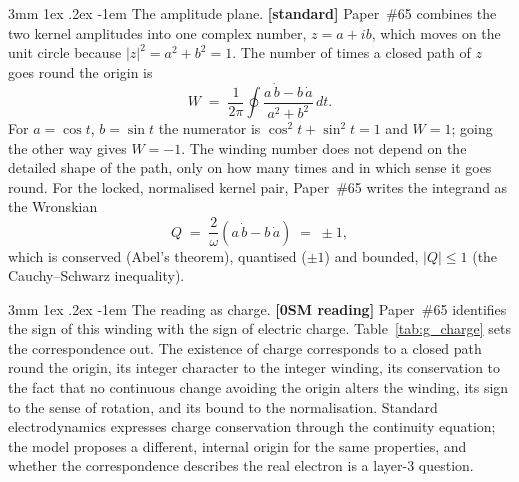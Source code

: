 \documentclass[%
 reprint, amsmath,amssymb, aps, prb, ]{revtex4-2}
\makeatletter
\numberwithin{equation}{section}
\renewcommand\paragraph{%
  \@startsection{paragraph}{4}{\z@}%
    {3mm \@plus 1ex \@minus .2ex}%
    {-1em}%
    {\normalfont\normalsize\itshape}}
\makeatother
\begin{document}
\paragraph{The amplitude plane.} \textbf{[standard]} Paper~\#65 combines the two kernel amplitudes into one complex number, $z = a + ib$, which moves on the unit circle because $\lvert z\rvert^{2} = a^{2} + b^{2} = 1$. The number of times a closed path of $z$ goes round the origin is
\begin{equation}
W \;=\; \frac{1}{2\pi}\oint \frac{a\,\dot b - b\,\dot a}{a^{2} + b^{2}}\,dt .
\label{eq:g_W}
\end{equation}
For $a = \cos t$, $b = \sin t$ the numerator is $\cos^{2}t + \sin^{2}t = 1$ and $W = 1$; going the other way gives $W = -1$. The winding number does not depend on the detailed shape of the path, only on how many times and in which sense it goes round. For the locked, normalised kernel pair, Paper~\#65 writes the integrand as the Wronskian
\begin{equation}
Q \;=\; \frac{2}{\omega}\left(a\,\dot b - b\,\dot a\right) \;=\; \pm1 ,
\label{eq:g_Q}
\end{equation}
which is conserved (Abel's theorem), quantised ($\pm1$) and bounded, $\lvert Q\rvert \le 1$ (the Cauchy--Schwarz inequality).

\paragraph{The reading as charge.} \textbf{[0SM reading]} Paper~\#65 identifies the sign of this winding with the sign of electric charge. Table~\ref{tab:g_charge} sets the correspondence out. The existence of charge corresponds to a closed path round the origin, its integer character to the integer winding, its conservation to the fact that no continuous change avoiding the origin alters the winding, its sign to the sense of rotation, and its bound to the normalisation. Standard electrodynamics expresses charge conservation through the continuity equation; the model proposes a different, internal origin for the same properties, and whether the correspondence describes the real electron is a layer-3 question.
\end{document}
